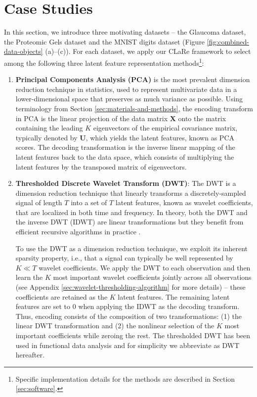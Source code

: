 \section{Case Studies}\label{sec:case-studies}

In this section, we introduce three motivating datasets -- the Glaucoma dataset, the Proteomic Gels dataset and the MNIST digits dataset (Figure \ref{fig:combined-data-objects} (a)--(c)).
For each dataset, we apply our CLaRe framework to select among the following three latent feature representation methods\footnote{Specific implementation details for the methods are described in Section \ref{sec:software}.}:
\begin{enumerate}
    \item \textbf{Principal Components Analysis (PCA)} \parencite{hotelling_analysis_1933} is the most prevalent dimension reduction technique in statistics, used to represent multivariate data in a lower-dimensional space that preserves as much variance as possible. 
    Using terminology from Section \ref{sec:materials-and-methods}, the encoding transform in PCA is the linear projection of the data matrix $\mathbf{X}$ onto the matrix containing the leading $K$ eigenvectors of the empirical covariance matrix, typically denoted by $\mathbf{U}$, which yields the latent features, known as PCA scores.
    The decoding transformation is the inverse linear mapping of the latent features back to the data space, which consists of multiplying the latent features by the transposed matrix of eigenvectors.
    \item \textbf{Thresholded Discrete Wavelet Transform (DWT)}: The DWT \parencite{daubechies_wavelet_1990, daubechies_ten_1992} is a dimension reduction technique that linearly transforms a discretely-sampled signal of length $T$ into a set of $T$ latent features, known as wavelet coefficients, that are localized in both time and frequency. In theory, both the DWT and the inverse DWT (IDWT) are linear transformations but they benefit from efficient recursive algorithms in practice  \parencite{daubechies_ten_1992}.
    
    To use the DWT as a dimension reduction technique, we exploit its inherent sparsity property, i.e., that a signal can typically be well represented by $K \ll T$ wavelet coefficients. We apply the DWT to each observation and then learn the $K$ most important wavelet coefficients jointly across all observations (see Appendix \ref{sec:wavelet-thresholding-algorithm} for more details) -- these coefficients are retained as the $K$ latent features. 
    The remaining latent features are set to $0$ when applying the IDWT as the decoding transform. 
    Thus, encoding consists of the composition of two transformations: (1) the linear DWT transformation and (2) the nonlinear selection of the $K$ most important coefficients while zeroing the rest.
    The thresholded DWT has been used in functional data analysis \parencite[see, e.g.,][]{morris_automated_2011} and for simplicity we abbreviate as DWT hereafter.


\end{enumerate}
